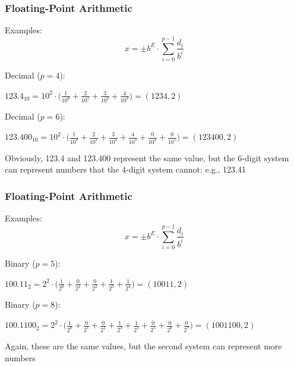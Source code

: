 \documentclass{beamer}
\begin{document}
\begin{frame}	
	\frametitle{Floating-Point Arithmetic}
	
	\begin{block}{Examples:}
		\begin{equation*}
			x = \pm b^E \cdot\sum_{i=0}^{p-1} \frac{d_i}{b^i}
		\end{equation*}
		
		
		Decimal ($p=4$):
		
		\vspace{10pt}
		$123.4_{10} = 10^2 \cdot \Big(\frac{1}{10^0}+\frac{2}{10^1}+\frac{3}{10^2}+\frac{4}{10^3}\Big) = (1234,2)$
		
		\vspace{10pt}
		
		Decimal ($p=6$):
		
		\vspace{10pt}
		$123.400_{10} = 10^2 \cdot \Big(\frac{1}{10^0}+\frac{2}{10^1}+\frac{3}{10^2}+\frac{4}{10^3}+\frac{0}{10^4}+\frac{0}{10^5}\Big) = (123400,2)$
		
		\vspace{10pt}		
		Obviously, 123.4 and 123.400 represent the same value, but the 6-digit system can represent numbers that the 4-digit system cannot: e.g., 123.41
	\end{block}
	
\end{frame}

\begin{frame}	
	\frametitle{Floating-Point Arithmetic}
	
	\begin{block}{Examples:}
		\begin{equation*}
			x = \pm b^E \cdot\sum_{i=0}^{p-1} \frac{d_i}{b^i}
		\end{equation*}
		
		
		Binary ($p=5$):
		
		\vspace{10pt}
		$100.11_{2} = 2^2 \cdot \Big(\frac{1}{2^0}+\frac{0}{2^1}+\frac{0}{2^2}+\frac{1}{2^3}+\frac{1}{2^4}\Big) = (10011,2)$
		
		\vspace{10pt}
		
		Binary ($p=8$):
		
		\vspace{10pt}
		$100.1100_{2} = 2^2 \cdot \Big(\frac{1}{2^0}+\frac{0}{2^1}+\frac{0}{2^2}+\frac{1}{2^3}+\frac{1}{2^4}+\frac{0}{2^5}+\frac{0}{2^6}+\frac{0}{2^7}\Big) = (1001100,2)$
		
		\vspace{10pt}		
		Again, these are the same values, but the second system can represent more numbers
	\end{block}
	
\end{frame}
\end{document}

